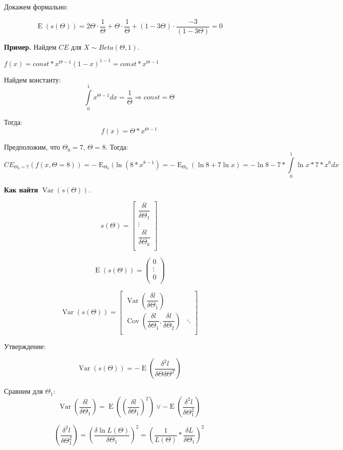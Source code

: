 \documentclass[12pt]{article} %
\theoremstyle{definition} %
\DeclareMathOperator{\Cov}{Cov}
\DeclareMathOperator{\Var}{Var}
\DeclareMathOperator{\E}{E}
\begin{document}
Докажем формально:

    \[
    \E(s(\Theta)) = 2\Theta\cdot\dfrac{1}{\Theta} + \Theta\cdot\dfrac{1}{\Theta} + (1 - 3\Theta)\cdot\dfrac{-3}{(1 - 3\Theta)} = 0
    \]

\textbf{Пример.} Найдем $CE$ для $X \sim Beta(\Theta, 1)$.

$f(x) = const*x^{\Theta-1}(1-x)^{1-1} = const*x^{\Theta-1}$

Найдем константу:
$$\int\limits_0^1x^{\Theta-1}dx = \dfrac{1}{\Theta} \Longrightarrow const = \Theta$$

Тогда:
$$f(x) = \Theta*x^{\Theta-1}$$

Предположим, что $\Theta_0=7$, $\Theta = 8$. Тогда:
$$CE_{\Theta_0=7}(f(x, \Theta=8)) = -\E_{\Theta_0}(\ln(8*x^{8-1}) = -\E_{\Theta_0}(\ln8 + 7\ln{x}) = -\ln8 - 7*\int\limits_0^1\ln{x}*7*x^6dx$$

\textbf{Как найти} $\Var(s(\Theta))$.

\[
s(\Theta) = 
\begin{bmatrix}
    \dfrac{\delta l}{\delta \Theta_{1}}\\
    \vdots\\
    \dfrac{\delta l}{\delta \Theta_{k}}\\
\end{bmatrix}
\]

\[
\E(s(\Theta)) = 
\begin{pmatrix}
    0\\
    \vdots\\
    0\\
\end{pmatrix}
\]

\[
\Var(s(\Theta)) = 
\begin{bmatrix}
    \Var(\dfrac{\delta l}{\delta \Theta_{1}}) & \\
    \Cov(\dfrac{\delta l}{\delta \Theta_{1}}, \dfrac{\delta l}{\delta \Theta_{2}}) 
    & \ddots\\
\end{bmatrix}
\]

Утверждение:

$$\Var(s(\Theta)) = -\E\left(\dfrac{\delta^2l}{\delta\Theta\delta\Theta^T}\right)$$

Сравним для $\Theta_1$:
$$\Var\left(\dfrac{\delta l}{\delta \Theta_1}\right) = \E\left(\left(\dfrac{\delta l}{\delta \Theta_1}\right)^2\right) \vee -\E\left(\dfrac{\delta^2l}{\delta\Theta_1^2}\right)$$

$$\left(\dfrac{\delta^2l}{\delta\Theta_1^2}\right) = \left(\dfrac{\delta \ln L(\Theta)}{\delta \Theta_1}\right)^2 = \left(\dfrac{1}{L(\Theta)}*\dfrac{\delta L}{\delta \Theta_1}\right)^2$$
\end{document}
